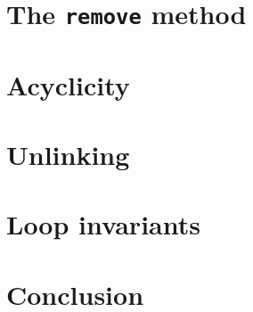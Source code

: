 \documentclass[runningheads]{llncs}
\begin{document}
\section{The \texttt{remove} method}\label{sec:remove}
\section{Acyclicity}\label{sec:acyclicity}
\section{Unlinking}\label{sec:unlinking}
\section{Loop invariants}\label{sec:loop-invariant}
\section{Conclusion}



\end{document}
